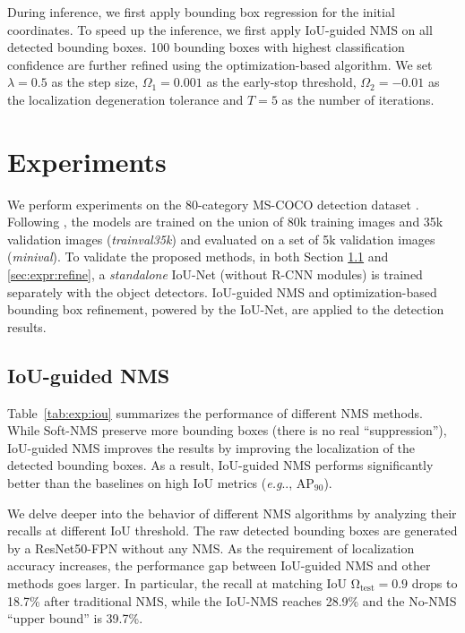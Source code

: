 \documentclass[runningheads]{llncs}
\makeatletter
\DeclareRobustCommand\onedot{\futurelet\@let@token\@onedot}
\def\@onedot{\ifx\@let@token.\else.\null\fi\xspace}
\def\eg{\emph{e.g}\onedot} \def\Eg{\emph{E.g}\onedot}
\makeatother
\begin{document}
During inference, we first apply bounding box regression for the initial coordinates. To speed up the inference, we first apply IoU-guided NMS on all detected bounding boxes. 100 bounding boxes with highest classification confidence are further refined using the optimization-based algorithm. 
We set $\lambda = 0.5$ as the step size, $\Omega_1 = 0.001$ as the early-stop threshold, $\Omega_2 = -0.01$ as the localization degeneration tolerance and $T = 5$ as the number of iterations. \section{Experiments}
We perform experiments on the 80-category MS-COCO detection dataset \cite{lin2014microsoft}. Following \cite{bell2016inside,Lin_2017_CVPR}, the models are trained on the union of 80k training images and 35k validation images (\emph{trainval35k}) and evaluated on a set of 5k validation images (\emph{minival}). To validate the proposed methods, in both Section \ref{sec:expr:nms} and \ref{sec:expr:refine}, a \emph{standalone} IoU-Net (without R-CNN modules) is trained separately with the object detectors. IoU-guided NMS and optimization-based bounding box refinement, powered by the IoU-Net, are applied to the detection results.

\subsection{IoU-guided NMS}
\label{sec:expr:nms}
Table~\ref{tab:exp:iou} summarizes the performance of different NMS methods. While Soft-NMS preserve more bounding boxes (there is no real ``suppression''), IoU-guided NMS improves the results by improving the localization of the detected bounding boxes. As a result, IoU-guided NMS performs significantly better than the baselines on high IoU metrics (\eg, AP${}_{\text{90}}$).

We delve deeper into the behavior of different NMS algorithms by analyzing their recalls at different IoU threshold. The raw detected bounding boxes are generated by a ResNet50-FPN without any NMS. As the requirement of localization accuracy increases, the performance gap between IoU-guided NMS and other methods goes larger. In particular, the recall at matching IoU $\mathrm{\Omega_{test}}=0.9$ drops to 18.7\% after traditional NMS, while the IoU-NMS reaches 28.9\% and the No-NMS ``upper bound'' is 39.7\%.
\end{document}
